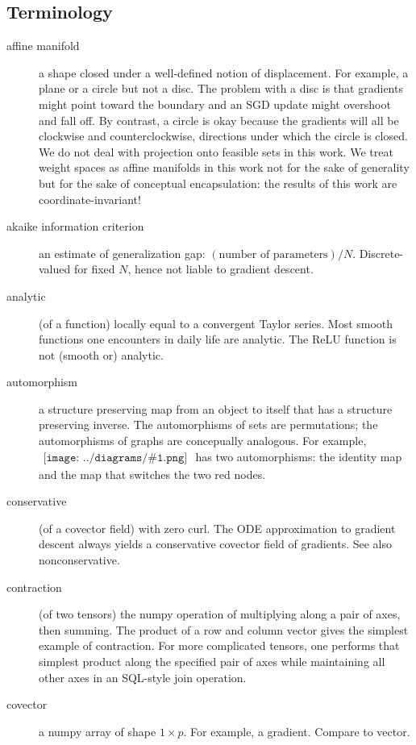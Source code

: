 \documentclass{article}
\theoremstyle{plain}
\theoremstyle{definition}
\newcommand{\sdia}[1]{\begin{gathered}\texttt{[image: ../diagrams/\#1.png]}\end{gathered}}
\begin{document}
    \subsection{Terminology}

    \begin{description}
        \item[affine manifold] a shape closed under a well-defined notion of displacement.  For example, a plane or a circle but not a disc.  The problem with a disc is that gradients might point toward the boundary and an SGD update might overshoot and fall off.  By contrast, a circle is okay because the gradients will all be clockwise and counterclockwise, directions under which the circle is closed.  We do not deal with projection onto feasible sets in this work.  We treat weight spaces as affine manifolds in this work not for the sake of generality but for the sake of conceptual encapsulation: the results of this work are coordinate-invariant! 
        \item[akaike information criterion] an estimate of generalization gap: $(\text{number of parameters})/N$.  Discrete-valued for fixed $N$, hence not liable to gradient descent. 
        \item[analytic] (of a function) locally equal to a convergent Taylor series.  Most smooth functions one encounters in daily life are analytic.  The ReLU function is not (smooth or) analytic. 
        \item[automorphism] a structure preserving map from an object to itself that has a structure preserving inverse.  The automorphisms of sets are permutations; the automorphisms of graphs are concepually analogous.  For example, $\sdia{(01-2)(02-12)}$ has two automorphisms: the identity map and the map that switches the two {\color{moor}red} nodes.   
        \item[conservative] (of a covector field) with zero curl.  The ODE approximation to gradient descent always yields a conservative covector field of gradients.  See also nonconservative. 
        \item[contraction] (of two tensors) the numpy operation of multiplying along a pair of axes, then summing.  The product of a row and column vector gives the simplest example of contraction.  For more complicated tensors, one performs that simplest product along the specified pair of axes while maintaining all other axes in an SQL-style join operation.  
        \item[covector] a numpy array of shape $1\times p$.  For example, a gradient.  Compare to vector.

\end{description}
\end{document}
